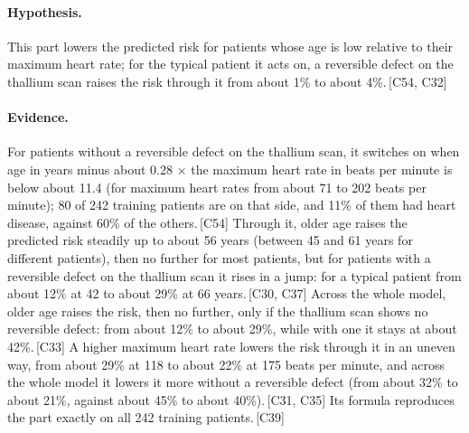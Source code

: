 \documentclass[a4paper,10pt]{article}
\newif\ifreviewmarks
\newcommand{\reviewrule}{\noindent{\color{BrickRed}\rule{\linewidth}{0.8pt}}}
\newenvironment{drafted}[1][]{%
  \ifreviewmarks\par\addvspace{\medskipamount}\reviewrule\par\nopagebreak
  \noindent{\color{BrickRed}\sffamily\footnotesize\textbf{Thesis Draft}\quad #1\hfill review}\par\nopagebreak\smallskip\fi}{%
  \ifreviewmarks\par\smallskip\noindent{\color{BrickRed}\sffamily\footnotesize end of thesis draft}\par\nopagebreak\reviewrule\par\medskip\fi}
\begin{document}
\begin{drafted}[plain-language layer: heart-s2-c1]
\paragraph{Hypothesis.} This part lowers the predicted risk for patients whose age is low relative to their maximum heart rate; for the typical patient it acts on, a reversible defect on the thallium scan raises the risk through it from about 1\% to about 4\%.\,{\scriptsize\textcolor{NavyBlue}{[C54, C32]}}
\paragraph{Evidence.} For patients without a reversible defect on the thallium scan, it switches on when age in years minus about 0.28 $\times$ the maximum heart rate in beats per minute is below about 11.4 (for maximum heart rates from about 71 to 202 beats per minute); 80 of 242 training patients are on that side, and 11\% of them had heart disease, against 60\% of the others.\,{\scriptsize\textcolor{NavyBlue}{[C54]}} Through it, older age raises the predicted risk steadily up to about 56 years (between 45 and 61 years for different patients), then no further for most patients, but for patients with a reversible defect on the thallium scan it rises in a jump: for a typical patient from about 12\% at 42 to about 29\% at 66 years.\,{\scriptsize\textcolor{NavyBlue}{[C30, C37]}} Across the whole model, older age raises the risk, then no further, only if the thallium scan shows no reversible defect: from about 12\% to about 29\%, while with one it stays at about 42\%.\,{\scriptsize\textcolor{NavyBlue}{[C33]}} A higher maximum heart rate lowers the risk through it in an uneven way, from about 29\% at 118 to about 22\% at 175 beats per minute, and across the whole model it lowers it more without a reversible defect (from about 32\% to about 21\%, against about 45\% to about 40\%).\,{\scriptsize\textcolor{NavyBlue}{[C31, C35]}} Its formula reproduces the part exactly on all 242 training patients.\,{\scriptsize\textcolor{NavyBlue}{[C39]}}
\par{}

\end{drafted}
\end{document}
